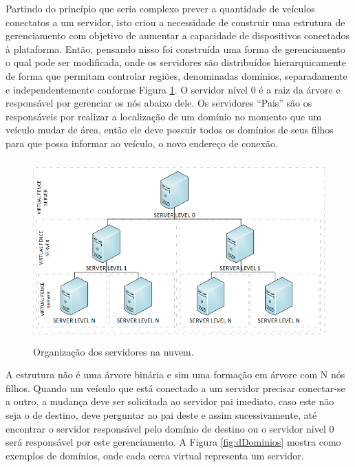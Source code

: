 \documentclass[
	12pt,				%
	oneside,			%
	a4paper,			%
	english,			%
	brazil				%
	]{abntex2ppgsi}
\begin{document}
Partindo do princípio que seria complexo prever a quantidade de veículos conectatos a um servidor, isto criou a necessidade de construir uma estrutura de gerenciamento com objetivo de aumentar a capacidade de dispositivos conectados à plataforma. Então, pensando nisso foi construída uma forma de gerenciamento o qual pode ser modificada, onde os servidores são  distribuídos hierarquicamente de forma que permitam controlar regiões, denominadas domínios, separadamente e independentemente conforme Figura \ref{fig:dServidores}. O servidor nível 0 é a raiz da árvore e responsável por gerenciar os nós abaixo dele. Os servidores ``Pais'' são os responsáveis por realizar a localização de um domínio no momento que um veículo mudar de área, então ele deve possuir todos os domínios de seus filhos para que possa informar ao veículo, o novo endereço de conexão. 


\begin{figure}[h!]
	\centering
	\includegraphics [width=12cm,height=7cm] {images/servidores.png}
	\caption{Organização dos servidores na nuvem.}
	\label{fig:dServidores}
\end{figure}

A estrutura não é uma árvore binária e sim uma formação em árvore com N nós filhos. Quando um veículo que está conectado a um servidor precisar conectar-se a outro, a mudança deve ser solicitada ao servidor pai imediato, caso este não seja o de destino, deve perguntar ao pai deste e assim sucessivamente, até encontrar o servidor responsável pelo domínio de destino ou o servidor nivel 0 será responsável por este gerenciamento. A Figura \ref{fig:dDominios} mostra como exemplos de domínios, onde cada cerca virtual representa um servidor.
\end{document}
